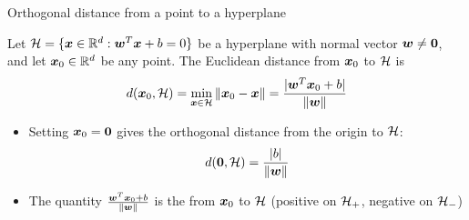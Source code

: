 \documentclass[aspectratio=169]{beamer}\usepackage[]{graphicx}\usepackage[]{xcolor}
\begin{document}
\begin{frame}{Orthogonal distance from a point to a hyperplane}
    \begin{importanttheorem}
        \label{th:distance-point-hyperplane}
        Let $\mathcal{H} = \{\bm{x} \in \mathbb{R}^d : \bm{w}^T \bm{x} + b = 0\}$ be a hyperplane with normal vector $\bw \neq \b0$, and let $\bm{x}_0 \in \mathbb{R}^d$ be any point. The Euclidean distance from $\bm{x}_0$ to $\mathcal{H}$ is
        \[
            d(\bm{x}_0, \mathcal{H}) = \min_{\bm{x} \in \mathcal{H}} \|\bm{x}_0 - \bm{x}\| = \frac{|\bm{w}^T \bm{x}_0 + b|}{\|\bm{w}\|}
        \]
    \end{importanttheorem}
    \vfill
    \begin{itemize}
        \item Setting $\bx_0 = \b0$ gives the orthogonal distance from the origin to $\mathcal{H}$:
        \[
            d(\b0, \H) = \frac{|b|}{\|\bw\|}
        \]
        \item The quantity $\frac{\bm{w}^T \bm{x}_0 + b}{\|\bm{w}\|}$ is the  from $\bm{x}_0$ to $\mathcal{H}$ (positive on $\mathcal{H}_+$, negative on $\mathcal{H}_-$)
    \end{itemize}
\end{frame}
\end{document}
